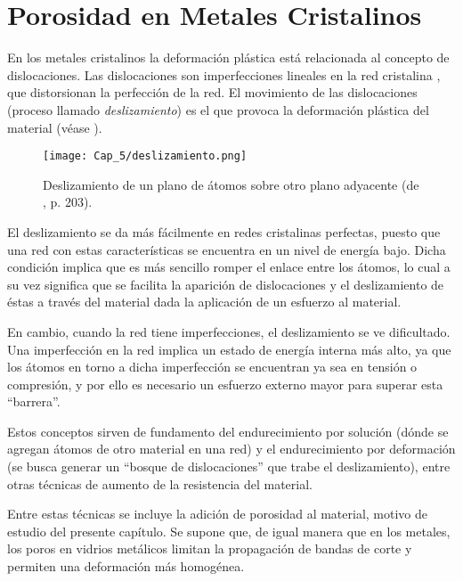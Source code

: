 
\section{Porosidad en Metales Cristalinos}
\label{S5_2}

En los metales cristalinos la deformación plástica está relacionada al concepto de dislocaciones. Las dislocaciones son imperfecciones lineales en
la red cristalina \citep{askeland98}, que distorsionan la perfección de la red. El movimiento de las dislocaciones (proceso llamado
\textit{deslizamiento}) es el que provoca la deformación plástica del material (véase ).

\begin{figure}[h!]
\centering
  \texttt{[image: Cap\_5/deslizamiento.png]}
  \caption[Deslizamiento de un plano de átomos sobre otro plano adyacente]{Deslizamiento de un plano de átomos sobre otro plano adyacente
  (de \cite{shackelford04}, p. 203).}
  \label{C5:fg:dislocaciones}
\end{figure}

El deslizamiento se da más fácilmente en redes cristalinas perfectas, puesto que una red con estas características se encuentra en un nivel
de energía bajo. Dicha condición implica que es más sencillo romper el enlace entre los átomos, lo cual a su vez significa que se facilita
la aparición de dislocaciones y el deslizamiento de éstas a través del material dada la aplicación de un esfuerzo al material.

En cambio, cuando la red tiene imperfecciones, el deslizamiento se ve dificultado. Una imperfección en la red implica un estado de energía
interna más alto, ya que los átomos en torno a dicha imperfección se encuentran ya sea en tensión o compresión, y por ello es necesario un
esfuerzo externo mayor para superar esta ``barrera''.

Estos conceptos sirven de fundamento del endurecimiento por solución (dónde se agregan átomos de otro material en una red) y el endurecimiento por deformación (se busca generar un ``bosque de dislocaciones'' que trabe el deslizamiento), entre otras técnicas de aumento de la resistencia del material. 

Entre estas técnicas se incluye la adición de porosidad al material, motivo de estudio del presente capítulo. Se supone que, de igual manera que en los metales, los poros en vidrios metálicos limitan la propagación de bandas de corte y permiten una deformación más homogénea.

